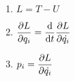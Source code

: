

\vspace*{\fill}
\centering

\begin{enumerate}
    \item $L = T - U$ 
    \item $\displaystyle \pdv{L}{q_{i}} = \dv{t}\pdv{L}{\dot{q_{i}}}$
    \item $\displaystyle p_{i} = \pdv{L}{\dot{q_{i}}}$
\end{enumerate}

\centering
\vspace*{\fill}

